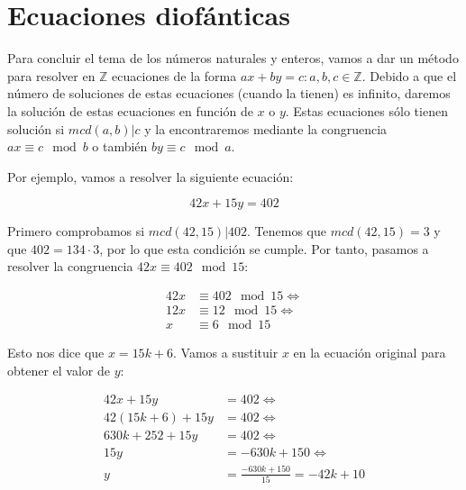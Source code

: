 \section{Ecuaciones diofánticas}\label{ecuaciones-diofanticas}

Para concluir el tema de los números naturales y enteros, vamos a dar un método para resolver en $\mathbb{Z}$ ecuaciones de la forma $ax + by = c : a,b,c \in\mathbb{Z}$.
Debido a que el número de soluciones de estas ecuaciones (cuando la tienen) es infinito, daremos la solución de estas ecuaciones en función de $x$ o $y$.
Estas ecuaciones sólo tienen solución si $mcd(a,b)|c$ y la encontraremos mediante la congruencia $ax \equiv c \mod b$ o también $by \equiv c \mod a$.

Por ejemplo, vamos a resolver la siguiente ecuación:

\[42x + 15y = 402\]

Primero comprobamos si $mcd(42,15)|402$.
Tenemos que $mcd(42,15) = 3$ y que $402 = 134 \cdot 3$, por lo que esta condición se cumple.
Por tanto, pasamos a resolver la congruencia $42x \equiv 402 \mod 15$:

\[
\begin{array}{ll}
	42x & \equiv 402 \mod 15 \iff \\
	12x & \equiv 12 \mod 15 \iff  \\
	x   & \equiv 6 \mod 15
\end{array}
\]

Esto nos dice que $x = 15k + 6$.
Vamos a sustituir $x$ en la ecuación original para obtener el valor de $y$:

\[
\begin{array}{ll}
	42x + 15y         & = 402 \iff         \\
	42(15k + 6) + 15y & = 402 \iff         \\
	630k + 252 + 15y  & = 402 \iff         \\
	15y               & = -630k + 150 \iff \\
	y                 & = \frac{-630k + 150}{15} = -42k + 10
\end{array}
\]


